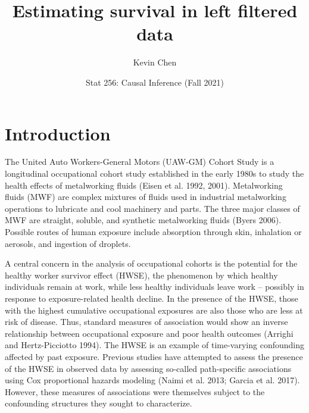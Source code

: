 \documentclass[
  11pt,
]{article}
\title{Estimating survival in left filtered data}
\author{Kevin Chen}
\date{Stat 256: Causal Inference (Fall 2021)}
\renewcommand{\headrulewidth}{0pt}
\begin{document}
\maketitle

\fancyhead[L]{}
\renewcommand{\headrulewidth}{0pt}

\onehalfspacing
\renewcommand{\arraystretch}{1.1}

\thispagestyle{empty}

\setlength{\columnseprule}{0pt}

\hypertarget{introduction}{%
\section{Introduction}\label{introduction}}

The United Auto Workers-General Motors (UAW-GM) Cohort Study is a
longitudinal occupational cohort study established in the early 1980s to
study the health effects of metalworking fluids (Eisen et al. 1992,
2001). Metalworking fluids (MWF) are complex mixtures of fluids used in
industrial metalworking operations to lubricate and cool machinery and
parts. The three major classes of MWF are straight, soluble, and
synthetic metalworking fluids (Byers 2006). Possible routes of human
exposure include absorption through skin, inhalation or aerosols, and
ingestion of droplets.

A central concern in the analysis of occupational cohorts is the
potential for the healthy worker survivor effect (HWSE), the phenomenon
by which healthy individuals remain at work, while less healthy
individuals leave work -- possibly in response to exposure-related
health decline. In the presence of the HWSE, those with the highest
cumulative occupational exposures are also those who are less at risk of
disease. Thus, standard measures of association would show an inverse
relationship between occupational exposure and poor health outcomes
(Arrighi and Hertz-Picciotto 1994). The HWSE is an example of
time-varying confounding affected by past exposure. Previous studies
have attempted to assess the presence of the HWSE in observed data by
assessing so-called path-specific associations using Cox proportional
hazards modeling (Naimi et al. 2013; Garcia et al. 2017). However, these
measures of associations were themselves subject to the confounding
structures they sought to characterize.
\end{document}
